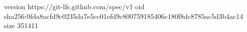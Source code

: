 version https://git-lfs.github.com/spec/v1
oid sha256:0fda8acfd9c0235da7e5cc01efd9c800759185406c180f8dc8785ac5d3b4ac14
size 351411
